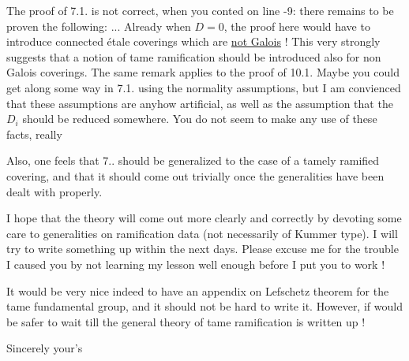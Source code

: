 \normalmarginpar
{}
The proof of 7.1. is not correct, when you conted on line -9: there remains to be proven the following: ... Already when $D=0$, the proof here would have to introduce connected étale coverings which are \uline{not Galois} ! This very strongly suggests that a notion of tame ramification should be introduced also  for non Galois coverings. The same remark applies to the proof of 10.1. Maybe you could get along some way in 7.1. using the normality assumptions, but I am convienced that these assumptions are anyhow artificial, as well as the assumption that the $D_i$ should be reduced somewhere. You do not seem to make any use of these facts, really

Also, one feels that 7.. should be generalized to the case of a tamely ramified covering, and that it should come out trivially once the generalities have been dealt with properly.

I hope that the theory will come out more clearly and correctly by devoting some care to generalities on ramification data (not necessarily of Kummer type). I will try to write something up within the next days. Please excuse me for the trouble I caused you by not learning my lesson well enough before I put you to work !

It would be very nice indeed to have an appendix on Lefschetz theorem for the tame fundamental group, and it should not be hard to write it. However, if would be safer to wait till the general theory of tame ramification is written up !

Sincerely your's\\
